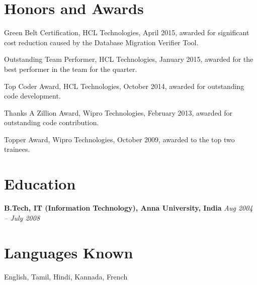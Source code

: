 \documentclass[margin]{resume}
\begin{document}
\begin{resume}
\section{\mysidestyle Honors and Awards}
\begin{list2}

\item Green Belt Certification, HCL Technologies, April 2015, awarded for
significant cost reduction caused by the Database Migration Verifier Tool.

\item Outstanding Team Performer, HCL Technologies, January 2015, awarded for the
best performer in the team for the quarter.

\item Top Coder Award, HCL Technologies, October 2014, awarded for outstanding
code development.

\item Thanks A Zillion Award, Wipro Technologies, February 2013, awarded for
outstanding code contribution.

\item Topper Award, Wipro Technologies, October 2009, awarded to the top two
trainees.

\end{list2}

\section{\mysidestyle Education}
\textbf{B.Tech, IT (Information Technology), Anna University, India} \hfill \textit{Aug 2004 -- July 2008}\\

\section{\mysidestyle Languages Known}
English, Tamil, Hindi, Kannada, French

\end{resume}
\end{document}
